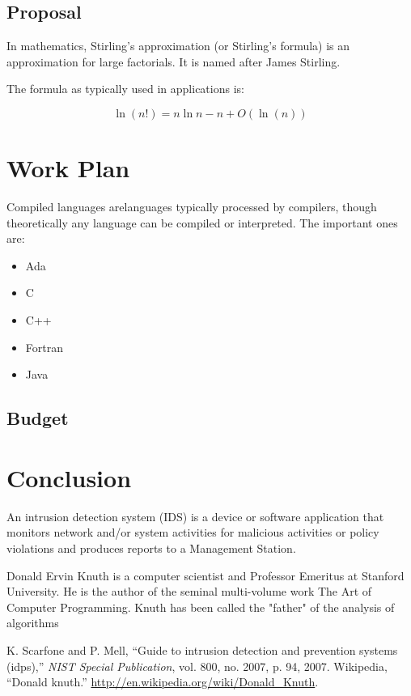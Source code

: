 \documentclass{fisatproject}
\begin{document}
\section{Proposal}
In mathematics, Stirling's approximation (or Stirling's formula) is an approximation for large factorials. It is named after James Stirling.

The formula as typically used in applications is:

$$
\ln (n!) = n \ln n - n  + O(\ln(n))
$$

\chapter{Work Plan}

Compiled languages arelanguages typically processed by compilers, though theoretically any language can be compiled or interpreted. The important ones are:
\begin{itemize}
\item Ada
\item C
\item C++
\item Fortran
\item Java
\end{itemize}

\section{Budget}


\chapter{Conclusion}

An intrusion detection system (IDS) \cite{nist} is a device or software application that monitors network and/or system activities for malicious activities or policy violations and produces reports to a Management Station.


Donald Ervin Knuth \cite{knuth} is a computer scientist and Professor Emeritus at Stanford University. He is the author of the seminal multi-volume work The Art of Computer Programming. Knuth has been called the "father" of the analysis of algorithms


\begin{thebibliography}{1}
 K. Scarfone and P. Mell, ``Guide to intrusion detection and prevention systems
(idps),'' \textit{NIST Special Publication}, vol. 800, no. 2007, p. 94, 2007.
 Wikipedia, ``Donald knuth.'' \url{http://en.wikipedia.org/wiki/Donald_Knuth}.


\end{thebibliography}
\end{document}
